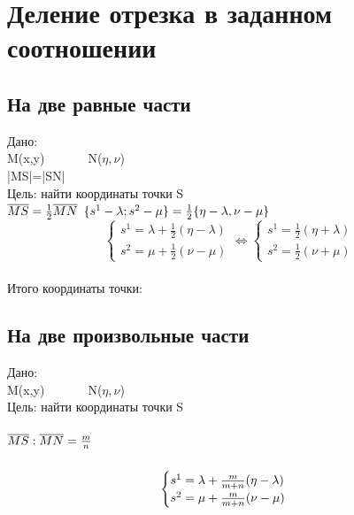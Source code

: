 \documentclass{book}
\begin{document}
\chapter{Деление отрезка в заданном соотношении}
\section{На две равные части}
Дано:\\
M(x,y)\ \ \ \ \ \ \ N($\eta,\nu$)\\
|MS|=|SN|\\
Цель: найти координаты точки S\\
$\overline{MS}=\frac{1}{2}\overline{MN}\\$
$\{s^1-\lambda;s^2-\mu\}=\frac{1}{2}\{\eta-\lambda,\nu-\mu\}\\$
\begin{equation}
    \begin{cases}
      s^1=\lambda+\frac{1}{2}(\eta-\lambda)\\
      s^2=\mu+\frac{1}{2}(\nu-\mu)
    \end{cases}
\Leftrightarrow
    \begin{cases}
        s^1=\frac{1}{2}(\eta+\lambda)\\
        s^2=\frac{1}{2}(\nu+\mu)
      \end{cases}
\end{equation}\\
Итого координаты точки:
\section{На две произвольные части}
Дано:\\
M(x,y)\ \ \ \ \ \ \ N($\eta,\nu$)\\
Цель: найти координаты точки S\\
\paragraph{$\overline{MS}:\overline{MN}=\frac{m}{n}\\$}
\begin{equation}
    \centering
    \begin{cases}
      s^1=\lambda+\frac{m}{m+n}(\eta-\lambda)\\
      s^2=\mu+\frac{m}{m+n}(\nu-\mu)
    \end{cases}
\end{equation}\\
\end{document}
